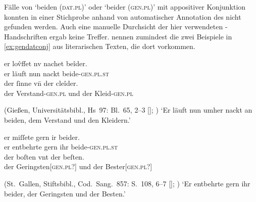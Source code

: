 Fälle von  `beiden (\textsc{dat.pl})' oder 
`beider (\textsc{gen.pl})' mit appositiver Konjunktion konnten in einer
Stichprobe anhand von  automatischer Annotation des
\CAO{} nicht gefunden werden. Auch eine manuelle Durchsicht der hier
verwendeten \KC{}-Handschriften ergab keine Treffer. \citet[626]{ksw2}
nennen zumindest die zwei Beispiele in \cref{ex:gendatconj} aus literarischen
Texten, die dort  vorkommen.

\begin{exe}
\ex \label{ex:gendatconj}
	\begin{xlist}
	\ex \label{ex:gendatconj_1}
		\gll er lov̂ffet nv nachet beîder. \\
			er läuft nun nackt beide-\textsc{gen.pl.st} \\
	\sn	\gll der ſinne vn̄ der cleîder. \\
			der Verstand-\textsc{gen.pl} und der
				Kleid-\textsc{gen.pl} \\
		\begin{taggedline}{(Gießen, Universitätsbibl., Hs~97:
			Bl.~65\vo, 2--3 [\cite[1102]{hsc}];
			\cite[vgl.][500~{[=~V.~3359--3360]}]{mertens2004})} %
		\trans `Er läuft nun umher nackt an beiden, dem
			Verstand und den Kleidern.'
		\end{taggedline}

	\ex \label{ex:gendatconj_2}
		\gll er miſſete gern ir beider. \\
			er entbehrte gern ihr beide-\textsc{gen.pl.st} \\
	\sn	\gll der boſten vnt der beſten. \\
			der Geringsten[\textsc{gen.pl}?] und der
			Bester[\textsc{gen.pl}?] \\
		\begin{taggedline}{(St.~Gallen, Stiftsbibl., Cod.~Sang.~857:
			S.~108, 6--7 [\cite[1211]{hsc}];
			\cite[vgl.][379~{[=~375.6--7]}]{knechtschirok2003})} %
		\trans `Er entbehrte gern ihr beider, der Geringsten
			und der Besten.'\footnotemark
		\end{taggedline}
	\end{xlist}
\end{exe}
%

